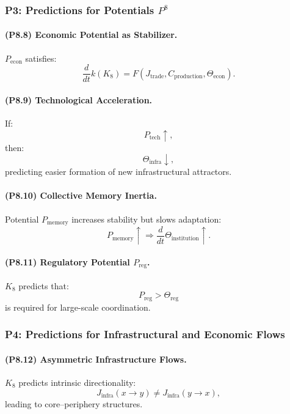 \subsubsection{P3: Predictions for Potentials $P^{8}$}

\paragraph{(P8.8) Economic Potential as Stabilizer.}
$P_{\mathrm{econ}}$ satisfies:
\[
\frac{d}{dt} k(K_8)
= F(J_{\mathrm{trade}}, C_{\mathrm{production}}, \Theta_{\mathrm{econ}}).
\]

\paragraph{(P8.9) Technological Acceleration.}
If:
\[
P_{\mathrm{tech}} \uparrow,
\]
then:
\[
\Theta_{\mathrm{infra}} \downarrow,
\]
predicting easier formation of new infrastructural attractors.

\paragraph{(P8.10) Collective Memory Inertia.}
Potential $P_{\mathrm{memory}}$ increases stability but slows adaptation:
\[
P_{\mathrm{memory}} \uparrow
\Rightarrow
\frac{d}{dt} \Theta_{\mathrm{institution}} \uparrow.
\]

\paragraph{(P8.11) Regulatory Potential $P_{\mathrm{reg}}$.}
$K_8$ predicts that:
\[
P_{\mathrm{reg}} > \Theta_{\mathrm{reg}}
\]
is required for large-scale coordination.

\subsubsection{P4: Predictions for Infrastructural and Economic Flows}

\paragraph{(P8.12) Asymmetric Infrastructure Flows.}
$K_8$ predicts intrinsic directionality:
\[
J_{\mathrm{infra}}(x \to y)
\neq
J_{\mathrm{infra}}(y \to x),
\]
leading to core–periphery structures.

